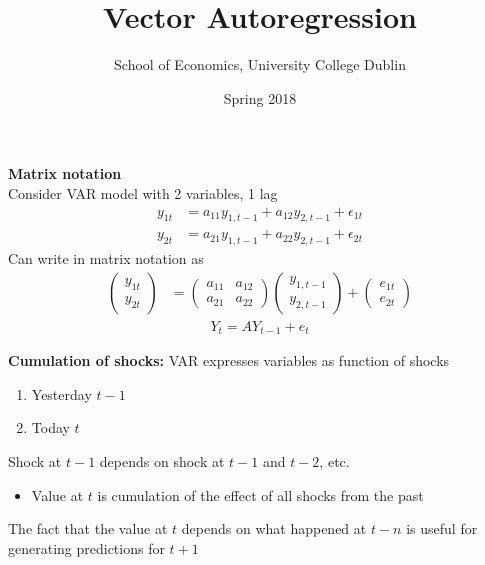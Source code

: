 \documentclass{beamer}
\title{Vector Autoregression}
\author{School of Economics, University College Dublin}
\date{Spring 2018}
\begin{document}
\begin{frame}
 \titlepage
\end{frame}

\begin{frame}
  \textbf{Matrix notation}\\
  Consider VAR model with 2 variables, 1 lag  
\begin{align}
  y_{1t} &= a_{11} y_{1, t-1} + a_{12} y_{2,t-1} + \epsilon_{1t}\\ \nonumber
  y_{2t} &= a_{21} y_{1, t-1} + a_{22} y_{2,t-1} + \epsilon_{2t}
\end{align} 
\medskip
 Can write in matrix notation as 
\begin{align}
   \begin{pmatrix}   y_{1t}\\  y_{2t}   \end{pmatrix} &=
   \begin{pmatrix}   a_{11} & a_{12}\\   a_{21} &a_{22}   \end{pmatrix}  \begin{pmatrix}   y_{1,t-1}\\  y_{2,t-1}  \end{pmatrix} +
   \begin{pmatrix}     e_{1t} \\ e_{2t}   \end{pmatrix}   
\end{align}
\begin{align}  Y_t = AY_{t-1} + e_{t} \end{align}
\end{frame}

\begin{frame}
 \textbf{Cumulation of shocks:} VAR expresses variables as function of shocks
 \begin{enumerate}
   \item Yesterday $t-1$
   \item Today $t$
 \end{enumerate}
 \medskip
 Shock at $t-1$ depends on shock at $t-1$ and $t-2$, etc.
 \begin{itemize}
   \item Value at $t$ is cumulation of the effect of all shocks from the past
 \end{itemize}
 \medskip
 The fact that the value at $t$ depends on what happened at $t-n$ is useful for generating predictions for $t+1$
\end{frame}
\end{document}
